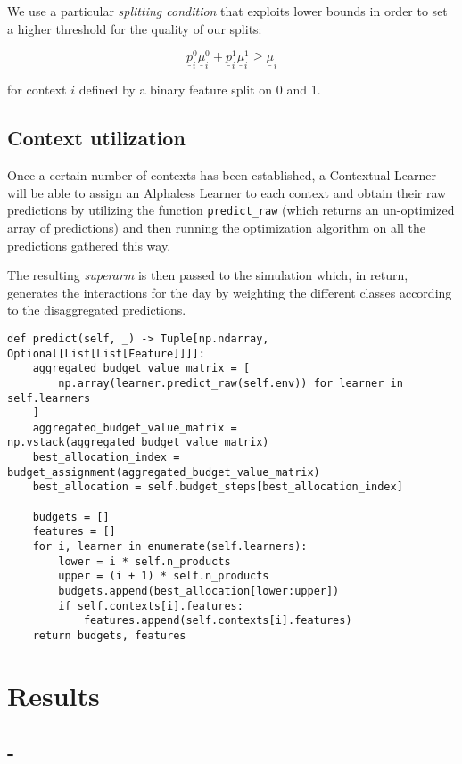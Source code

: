 We use a particular \textit{splitting condition} that exploits lower bounds in order to set a higher threshold for the quality of our splits:

\begin{Large}
	\begin{displaymath}
		\underline{p}_i^0 \underline{\mu}_i^0 + \underline{p}_i^1 \underline{\mu}_i^1 \geq \underline{\mu}_i
	\end{displaymath}
\end{Large}

for context $i$ defined by a binary feature split on 0 and 1.

\subsection{Context utilization}

Once a certain number of contexts has been established, a Contextual Learner will be able to assign an Alphaless Learner to each context and obtain their raw predictions by utilizing the function \texttt{predict\_raw} (which returns an un-optimized array of predictions) and then running the optimization algorithm on all the predictions gathered this way.

The resulting \textit{superarm} is then passed to the simulation which, in return, generates the interactions for the day by weighting the different classes according to the disaggregated predictions.

\begin{lstlisting}[style=Python]
def predict(self, _) -> Tuple[np.ndarray, Optional[List[List[Feature]]]]:
	aggregated_budget_value_matrix = [
		np.array(learner.predict_raw(self.env)) for learner in self.learners
	]
	aggregated_budget_value_matrix = np.vstack(aggregated_budget_value_matrix)
	best_allocation_index = budget_assignment(aggregated_budget_value_matrix)
	best_allocation = self.budget_steps[best_allocation_index]

	budgets = []
	features = []
	for i, learner in enumerate(self.learners):
		lower = i * self.n_products
		upper = (i + 1) * self.n_products
		budgets.append(best_allocation[lower:upper])
		if self.contexts[i].features:
			features.append(self.contexts[i].features)
	return budgets, features
\end{lstlisting}

\section{Results}

\subsection{-}
